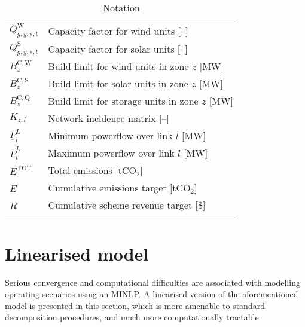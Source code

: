 \documentclass{article}
\newcommand{\iGenerator}{g}
\newcommand{\iYear}{y}
\newcommand{\iScenario}{s}
\newcommand{\iInterval}{t}
\newcommand{\iZone}{z}
\newcommand{\iLink}{l}
\newcommand{\cBuildLimitWind}{B^{\mathrm{C,\mathrm{W}}}_{\iZone}}
\newcommand{\cBuildLimitSolar}{B^{\mathrm{C,\mathrm{S}}}_{\iZone}}
\newcommand{\cBuildLimitStorage}{B^{\mathrm{C,\mathrm{Q}}}_{\iZone}}
\newcommand{\cCapacityFactorWind}[1][\iGenerator,\iYear,\iScenario,\iInterval]{Q_{#1}^{\mathrm{W}}}
\newcommand{\cCapacityFactorSolar}[1][\iGenerator,\iYear,\iScenario,\iInterval]{Q_{#1}^{\mathrm{S}}}
\newcommand{\cIncidenceMatrix}[1][\iZone,\iLink]{K_{#1}}
\newcommand{\cPowerFlowMin}{\underline{P}_{\iLink}^{L}}
\newcommand{\cPowerFlowMax}{\overline{P}_{\iLink}^{L}}
\newcommand{\cEmmissionsCumulativeTarget}{\overline{E}}
\newcommand{\cSchemeRevenueCumulativeTarget}{\overline{R}}
\newcommand{\cEmissionsTotal}{E^{\mathrm{TOT}}}
\begin{document}
\begin{longtable}{ p{}  p{}}
		$\cCapacityFactorWind$ & Capacity factor for wind units [--]\\
		$\cCapacityFactorSolar$ & Capacity factor for solar units [--]\\
		$\cBuildLimitWind$ & Build limit for wind units in zone $\iZone$ [MW]\\
		$\cBuildLimitSolar$ & Build limit for solar units in zone $\iZone$ [MW]\\
		$\cBuildLimitStorage$ & Build limit for storage units in zone $\iZone$ [MW]\\
		$\cIncidenceMatrix$ & Network incidence matrix [--]\\
		$\cPowerFlowMin$ & Minimum powerflow over link $\iLink$ [MW]\\
		$\cPowerFlowMax$ & Maximum powerflow over link $\iLink$ [MW]\\
		$\cEmissionsTotal$ & Total emissions [tCO$_{2}$]\\
		$\cEmmissionsCumulativeTarget$ & Cumulative emissions target [tCO$_{2}$]\\
		$\cSchemeRevenueCumulativeTarget$ & Cumulative scheme revenue target [\$]\\
		\hline
		\caption{Notation}
	\end{longtable}

\section{Linearised model}
Serious convergence and computational difficulties are associated with modelling operating scenarios using an MINLP. A linearised version of the aforementioned model is presented in this section, which is more amenable to standard decomposition procedures, and much more computationally tractable.
\end{document}
